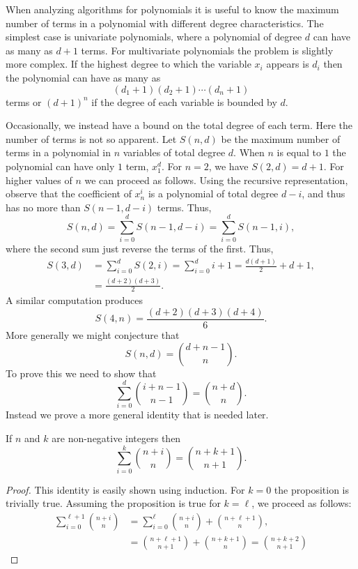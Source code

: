 When analyzing algorithms for polynomials it is useful to know the
maximum number of terms in a polynomial with different degree
characteristics.  The simplest case is univariate polynomials, where a
polynomial of degree $d$ can have as many as $d+1$ terms.  For
multivariate polynomials the problem is slightly more complex.  If the
highest degree to which the variable $x_i$ appears is $d_i$ then the
polynomial can have as many as
\[
(d_1 + 1) (d_2 + 1) \cdots (d_n + 1)
\]
terms or $(d+1)^n$ if the degree of each variable is bounded by $d$.

Occasionally, we instead have a bound on the total degree of each
term.  Here the number of terms is not so apparent.  Let $S(n, d)$ be
the maximum number of terms in a polynomial in $n$ variables of total
degree $d$.  When $n$ is equal to $1$ the polynomial can have only
$1$ term, $x_1^d$.  For $n=2$, we have $S(2, d)= d+1$.  For higher
values of $n$ we can proceed as follows.  Using the recursive
representation, observe that the coefficient of $x_n^i$ is a
polynomial of total degree $d-i$, and thus has no more than $S(n-1,
d-i)$ terms.  Thus,
\[
S(n, d) = \sum_{i=0}^d S(n-1, d-i) = \sum_{i=0}^d S(n-1, i),
\]
where the second sum just reverse the terms of the first.  Thus,
\[
\begin{aligned}
S(3, d) & \displaystyle = \sum_{i=0}^d S(2, i) = \sum_{i=0}^d i+1 = \frac{d(d+1)}{2} +
d + 1, \\
 &\displaystyle = \frac{(d+2)(d+3)}{2}.
\end{aligned}
\]
A similar computation produces
\[
S(4, n) = \frac{(d+2) (d+3) (d+4)}{6}.
\]
More generally we might conjecture that
\[
S(n, d) = \binom{d + n - 1}{n}.
\]
To prove this we need to show that 
\[
\sum_{i=0}^d \binom{i + n - 1}{n - 1} = \binom{n + d}{n}.
\]
Instead we prove a more general identity that is needed later.

\begin{proposition}\label{CombinSum:Prop}
If $n$ and $k$ are non-negative integers then 
\[
\sum_{i=0}^k \binom{ n + i}{n} = \binom{n + k + 1}{n + 1}.
\]
\end{proposition}

\begin{proof}
This identity is easily shown using induction.  For $k = 0$ the
proposition is trivially true.  Assuming the proposition is true for
$k = \ell$, we proceed as follows:
\[
\begin{aligned}
\displaystyle \sum_{i=0}^{\ell+1} \binom{n + i}{n} & = 
\displaystyle \sum_{i=0}^{\ell} \binom{n + i}{n} 
    + \binom{n + \ell + 1}{n}, \\
 & \displaystyle = \binom{n + \ell + 1}{n + 1} + \binom{n + k + 1}{n}
= \binom{n + k + 2}{n + 1}
\end{aligned}
\]
\end{proof}

